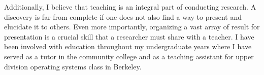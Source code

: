 \documentclass[11pt]{article}
\begin{document}



Additionally, I believe that teaching is an integral part of conducting research. A discovery is far from complete if one does not also find a way to present and elucidate it to others. Even more importantly, organizing a vast array of result for presentation is a crucial skill that a researcher must share with a teacher. I have been involved with education throughout my undergraduate years where I have served as a tutor in the community college and as a teaching assistant for upper division operating systems class in Berkeley. \newline
\end{document}
